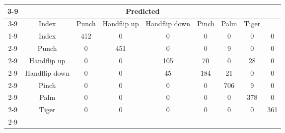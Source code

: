 \documentclass{standalone}
\begin{document}
 
 \begin{tabular}{|c |c |c |c |c |c |c |c |c |}
\cline{3-9}\multicolumn{2}{c|}{} & \multicolumn{7}{c|}{Predicted} \\ 
\cline{3-9} \multicolumn{2}{c |}{ } & Index & Punch & Handflip up & Handflip down & Pinch & Palm & Tiger\\ 
\cline{1-9}\multirow{7}{*}{\rotatebox[origin=c]{90}{Actual}} & Index & 412 & 0 & 0 & 0 & 0 & 0 & 0\\ 
 \cline{2-9} & Punch & 0 & 451 & 0 & 0 & 9 & 0 & 0\\ 
 \cline{2-9} & Handflip up & 0 & 0 & 105 & 70 & 0 & 28 & 0\\ 
 \cline{2-9} & Handflip down & 0 & 0 & 45 & 184 & 21 & 0 & 0\\ 
 \cline{2-9} & Pinch & 0 & 0 & 0 & 0 & 706 & 9 & 0\\ 
 \cline{2-9} & Palm & 0 & 0 & 0 & 0 & 0 & 378 & 0\\ 
 \cline{2-9} & Tiger & 0 & 0 & 0 & 0 & 0 & 0 & 361\\ 
 \cline{2-9}\hline \end{tabular}
 
\end{document}
